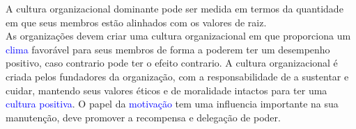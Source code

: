 A cultura organizacional dominante pode ser medida em termos da quantidade em que seus membros estão alinhados com os valores de raiz. \\
As organizações devem criar uma cultura organizacional em que proporciona um \textcolor{blue}{clima} favorável para seus membros de forma a poderem ter um desempenho positivo, caso contrario pode ter o efeito contrario. A cultura organizacional é criada pelos fundadores da organização, com a responsabilidade de a sustentar e cuidar, mantendo seus valores éticos e de moralidade intactos para ter uma \textcolor{blue}{cultura positiva}. O papel da \textcolor{blue}{motivação} tem uma influencia importante na sua manutenção, deve promover a recompensa e delegação de poder.\cite{book_4} \cite{book_2}
